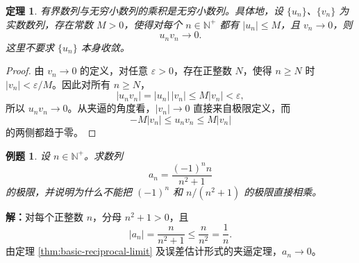 \documentclass[UTF8,fontset=fandol,11pt]{ctexart}
\newtheorem{theorem}[definition]{定理}
\newtheorem{example}[definition]{例题}
\begin{document}
\begin{theorem}
\label{thm:bounded-times-zero}有界数列与无穷小数列的乘积是无穷小数列。具体地，设 $\{u_n\}$、$\{v_n\}$ 为实数数列，存在常数 $M>0$，使得对每个 $n\in\mathbb{N}^{+}$ 都有 $|u_n|\leq M$，且 $v_n\to0$，则
\[
u_nv_n\to0.
\]
这里不要求 $\{u_n\}$ 本身收敛。
\end{theorem}
\begin{proof}
由 $v_n\to0$ 的定义，对任意 $\varepsilon>0$，存在正整数 $N$，使得 $n\geq N$ 时 $|v_n|<\varepsilon/M$。因此对所有 $n\geq N$，
\[
|u_nv_n|=|u_n|\,|v_n|\leq M|v_n|<\varepsilon,
\]
所以 $u_nv_n\to0$。从夹逼的角度看，$|v_n|\to0$ 直接来自极限定义，而
\[
-M|v_n|\leq u_nv_n\leq M|v_n|
\]
的两侧都趋于零。
\end{proof}
\begin{example}
设 $n\in\mathbb{N}^{+}$。求数列
\[
a_n=\frac{(-1)^n n}{n^2+1}
\]
的极限，并说明为什么不能把 $(-1)^n$ 和 $n/(n^2+1)$ 的极限直接相乘。
\end{example}
\par\noindent\textbf{解：}对每个正整数 $n$，分母 $n^2+1>0$，且
\[
|a_n|=\frac{n}{n^2+1}\leq\frac{n}{n^2}=\frac1n.
\]
由定理 \ref{thm:basic-reciprocal-limit} 及误差估计形式的夹逼定理，$a_n\to0$。
\end{document}
